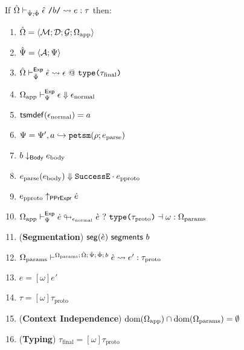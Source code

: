 \begingroup
\def\thetheorem{\ref{thm:petsm-reasoning-principles}}
\begin{theorem}
If ${\hat\Omega} \vdash_{\hat{\Psi}; \hat\Phi} {\hat\epsilon}~\texttt{/}b\texttt{/} \leadsto e : \tau$ then:
\begin{enumerate}
  \item ${\hat\Omega} = \langle \mathcal{M}; \mathcal{D}; \mathcal{G}; \Omega_\text{app} \rangle$
  \item $\hat{\Psi}=\langle \mathcal{A}; \Psi \rangle$
  \item ${\hat\Omega} \vdash_{\hat{\Psi}}^{\mathsf{Exp}} {\hat\epsilon} \leadsto \epsilon~@~\texttt{type}\texttt{(}\tau_\text{final}\texttt{)}$
  \item $\Omega_\text{app} \vdash_{\Psi}^\mathsf{Exp} \epsilon \Downarrow \epsilon_\text{normal}$
  \item $\mathsf{tsmdef}(\epsilon_\text{normal})=a$
  \item $\Psi = \Psi', a \hookrightarrow \texttt{petsm}(\rho; e_\text{parse})$
  \item $b \downarrow_\mathsf{Body} e_\text{body}$
  \item $e_\text{parse}(e_\text{body}) \Downarrow {\mathtt{SuccessE}}\cdot{e_\text{pproto}}$
  \item $e_\text{pproto} \uparrow_\mathsf{PPrExpr} \dot{e}$
  \item $\Omega_\text{app} \vdash_{\Psi}^\mathsf{Exp} \dot{e} \looparrowright_{\epsilon_\text{normal}} \grave{e} ~?~ \texttt{type}\texttt{(}\tau_\text{proto}\texttt{)} \dashv \omega : \Omega_\text{params}$
  \item (\textbf{Segmentation}) $\mathsf{seg}(\grave{e})~\mathsf{segments}~b$
  \item $\Omega_\text{params} \vdash^{\Omega_\text{params};\,{\hat\Omega};\,\hat{\Psi};\,\hat\Phi;\,b} \grave{e} \leadsto e' : \tau_\text{proto}$
  \item $e = [\omega]e'$
  \item $\tau = [\omega]\tau_\text{proto}$
  \item (\textbf{Context Independence}) $\text{dom}(\Omega_\text{app}) \cap \text{dom}(\Omega_\text{params}) = \emptyset$
  \item (\textbf{Typing}) $\tau_\text{final} = [\omega]\tau_\text{proto}$
\end{enumerate}
\end{theorem}
\endgroup

